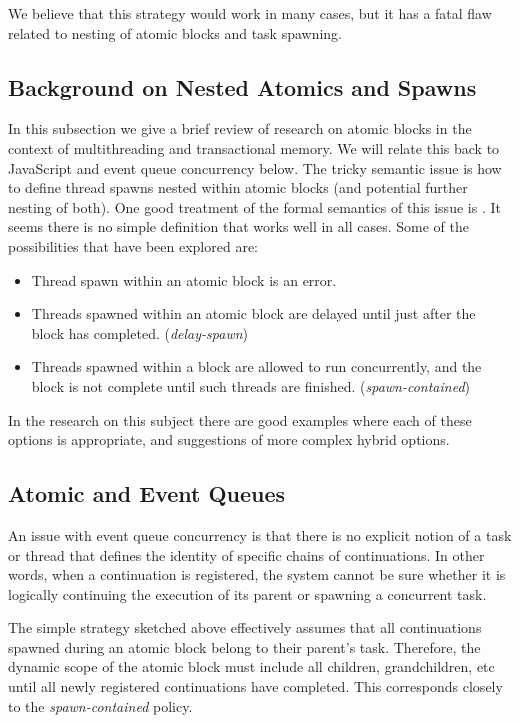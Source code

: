 \documentclass[sigplan,10pt,review,anonymous]{acmart}\settopmatter{printfolios=true,printccs=false,printacmref=false}
\begin{document}
We believe that this strategy would work in many cases, but it has a fatal flaw related to nesting of atomic blocks and task spawning.

\subsection{Background on Nested Atomics and Spawns}

In this subsection we give a brief review of research on atomic blocks in the context of multithreading and transactional memory.
We will relate this back to JavaScript and event queue concurrency below.
The tricky semantic issue is how to define thread spawns nested within atomic blocks (and potential further nesting of both).
One good treatment of the formal semantics of this issue is \cite{Moore2008}.
It seems there is no simple definition that works well in all cases.
Some of the possibilities that have been explored are:
\begin{itemize}
  \item Thread spawn within an atomic block is an error.
  \item Threads spawned within an atomic block are delayed until just after the block has completed. (\emph{delay-spawn})
  \item Threads spawned within a block are allowed to run concurrently, and the block is not complete until such threads are finished. (\emph{spawn-contained})
\end{itemize}

In the research on this subject there are good examples where each of these options is appropriate, and suggestions of more complex hybrid options.

\subsection{Atomic and Event Queues}

An issue with event queue concurrency is that there is no explicit notion of a task or thread that defines the identity of specific chains of continuations.
In other words, when a continuation is registered, the system cannot be sure whether it is logically continuing the execution of its parent or spawning a concurrent task.

The simple strategy sketched above effectively assumes that all continuations spawned during an atomic block belong to their parent's task.
Therefore, the dynamic scope of the atomic block must include all children, grandchildren, etc until all newly registered continuations have completed.
This corresponds closely to the \emph{spawn-contained} policy.
\end{document}
